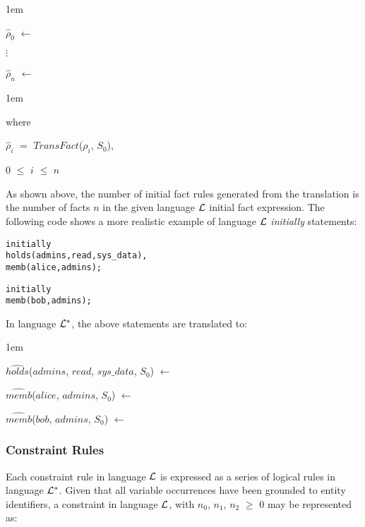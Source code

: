 \documentclass[11pt]{report}
\newenvironment{vverbatim}
{
  \begin{alltt}
}
{
    \vspace{-\baselineskip}
  \end{alltt}
}
\newenvironment{vquote}
{
  \begin{list}{}{\leftmargin 1em}\item[]
}
{
  \end{list}
}
\begin{document}
          \begin{vquote}
            $\hat{\rho}_{0}$ $\leftarrow$

            $\vdots$

            $\hat{\rho}_{n}$ $\leftarrow$
          \end{vquote}

          \begin{vquote}
            where

            \hspace{1em}
            $\hat{\rho}_{i}$ $=$ $TransFact$($\rho_{i}$, $S_{0}$),

            \hspace{1em}
            $0$ $\leq$ $i$ $\leq$ $n$
          \end{vquote}

          As shown above, the number of initial fact rules generated from the
          translation is the number of facts $n$ in the given language
          ${\cal L}$ initial fact expression. The following code shows a
          more realistic example of language ${\cal L}$ {\em initially}
          statements:

          \begin{vverbatim}
  initially
    holds(admins, read, sys\_data),
    memb(alice, admins);

  initially
    memb(bob, admins);
          \end{vverbatim}

          \noindent
          In language ${\cal L}^{*}$, the above statements are translated to:

          \begin{vquote}
            $\hat{holds}$($admins$, $read$, $sys\_data$, $S_{0}$)
              $\leftarrow$

            $\hat{memb}$($alice$, $admins$, $S_{0}$) $\leftarrow$

            $\hat{memb}$($bob$, $admins$, $S_{0}$) $\leftarrow$
          \end{vquote}

        \subsubsection{Constraint Rules}

          Each constraint rule in language ${\cal L}$ is expressed as a
          series of logical rules in language ${\cal L}^{*}$. Given that all
          variable occurrences have been grounded to entity identifiers, a
          constraint in language ${\cal L}$, with $n_0$, $n_1$, $n_2$ $\geq$
          $0$ may be represented as:
\end{document}

